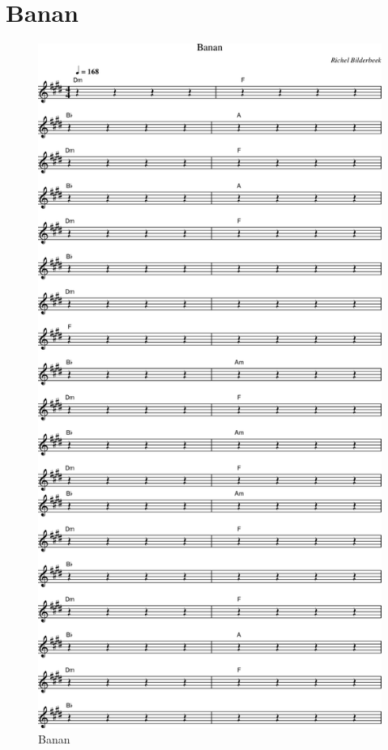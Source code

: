 \section{Banan}



\begin{figure}[!htbp]
  \includegraphics[width=\textwidth,height=\textheight,keepaspectratio]{../songs/xx_banan.png}
  \caption{Banan}
  \label{fig:xx_banan}
\end{figure}
